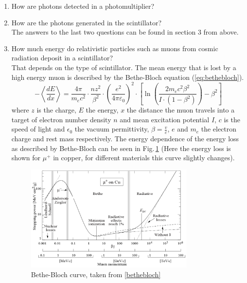 \begin{enumerate}
\item How are photons detected in a photomultiplier?\\
\item How are the photons generated in the scintillator?\\
The answers to the last two questions can be found in section 3 from above.
\item How much energy do relativistic particles such as muons from cosmic radiation deposit in a scintillator?\\
That depends on the type of scintillator. The mean energy that is lost by a high energy muon is described by the Bethe-Bloch equation (\ref{eq:bethebloch}).
\begin{equation} \label{eq:bethebloch}
	-\left\langle {\frac {dE}{dx}}\right\rangle ={\frac {4\pi }{m_{e}c^{2}}}\cdot {\frac {nz^{2}}{\beta ^{2}}}\cdot \left({\frac {e^{2}}{4\pi \varepsilon _{0}}}\right)^{2}\cdot \left[\ln \left({\frac {2m_{e}c^{2}\beta ^{2}}{I\cdot (1-\beta ^{2})}}\right)-\beta ^{2}\right]
\end{equation}
where $z$ is the charge, $E$ the energy, $x$ the distance the muon travels into a target of electron number density $n$ and mean excitation potential $I$, $c$ is the speed of light and $\epsilon_0$ the vacuum permittivity, $\beta=\frac{v}{c}$, $e$ and $m_e$ the electron charge and rest mass respectively. The energy dependence of the energy loss as described by Bethe-Bloch can be seen in Fig.\,\ref{f:bethebloch} (Here the energy loss is shown for $\mu^+$ in copper, for different materials this curve slightly changes).
\begin{figure}[H]
    \centering
    \includegraphics[width=0.8\textwidth]{figures/bethebloch.png}
    \caption{Bethe-Bloch curve, taken from \ref{bethebloch}}
    \label{f:bethebloch}
\end{figure}

\end{enumerate}
